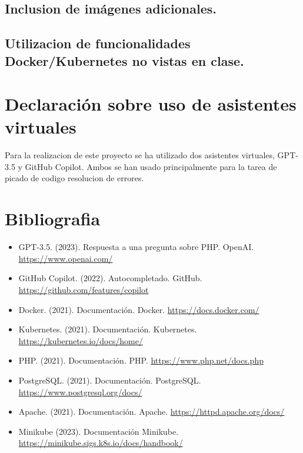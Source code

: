 \documentclass{report}
\begin{document}
        \clearpage
        \section{Inclusion de imágenes adicionales.}
        \clearpage
        \section{Utilizacion de funcionalidades Docker/Kubernetes no vistas en clase.}
        \clearpage
    \chapter{Declaración sobre uso de asistentes virtuales}
        Para la realizacion de este proyecto se ha utilizado dos asistentes virtuales, GPT-3.5 y GitHub Copilot.
        Ambos se han usado principalmente para la tarea de picado de codigo resolucion de errores.
    \chapter{Bibliografia}
        \begin{itemize}
            \item GPT-3.5. (2023). Respuesta a una pregunta sobre PHP. OpenAI. \url{https://www.openai.com/}
            \item GitHub Copilot. (2022). Autocompletado. GitHub. \url{https://github.com/features/copilot}
            \item Docker. (2021). Documentación. Docker. \url{https://docs.docker.com/}
            \item Kubernetes. (2021). Documentación. Kubernetes. \url{https://kubernetes.io/docs/home/}
            \item PHP. (2021). Documentación. PHP. \url{https://www.php.net/docs.php}
            \item PostgreSQL. (2021). Documentación. PostgreSQL. \url{https://www.postgresql.org/docs/}
            \item Apache. (2021). Documentación. Apache. \url{https://httpd.apache.org/docs/}
            \item Minikube (2023). Documentación Minikube. \url{https://minikube.sigs.k8s.io/docs/handbook/}
        \end{itemize}
\end{document}

